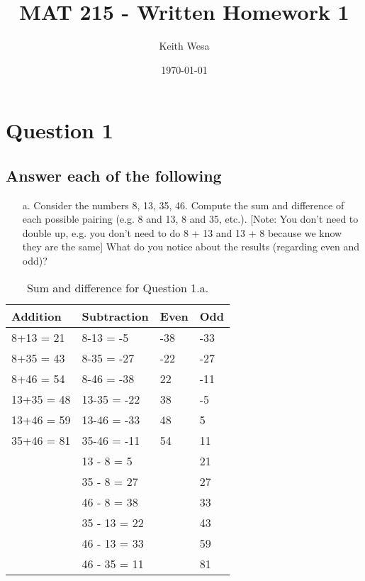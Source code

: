\documentclass{article}
\author{Keith Wesa}
\title{MAT 215 - Written Homework 1}
\date{\today}
\begin{document}
\section*{Question 1}

\subsection*{\textbf{Answer each of the following \newline [12 marks]}}
\begin{itemize}
    \item[a.] Consider the numbers 8, 13, 35, 46. Compute the sum and difference of each
    possible pairing (e.g. 8 and 13, 8 and 35, etc.). [Note: You don’t need to
    double up, e.g. you don’t need to do 8 + 13 and 13 + 8 because we know
    they are the same] What do you notice about the results (regarding even and
    odd)?
\end{itemize}

\begin{table}[!htb]
    \caption{Sum and difference for Question 1.a.}
    \begin{minipage}{1.0\linewidth}
      \label{tab:table_label}
      \begin{center}
        \begin{tabular}{ l | l | l | l }
            \textbf{Addition} & \textbf{Subtraction} & {Even} & {Odd} \\ \hline
            8+13 = 21  & 8-13 = -5 & -38 & -33 \\
            8+35 = 43 & 8-35 = -27 & -22 & -27 \\
            8+46 = 54 & 8-46 = -38 & 22 & -11 \\
            13+35 = 48 & 13-35 = -22 & 38 & -5 \\
            13+46 = 59 & 13-46 = -33 & 48 & 5 \\
            35+46 = 81 & 35-46 = -11 & 54 & 11 \\
                       & 13 - 8 = 5  & & 21 \\
                       & 35 - 8 = 27 & & 27 \\
                       & 46 - 8 = 38 & & 33 \\
                       & 35 - 13 = 22 & & 43 \\
                       & 46 - 13 = 33 & & 59\\
                       & 46 - 35 = 11 & & 81\\       
        \end{tabular}
    \end{center}
    \end{minipage}%
\end{table}
     
\end{document}
